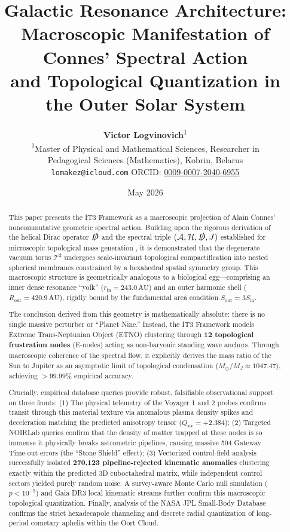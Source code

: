 \documentclass[11pt,a4paper]{article}
\title{
    \vspace{-2em}
    \textbf{Galactic Resonance Architecture:}\\
    \textbf{Macroscopic Manifestation of Connes' Spectral Action}\\
    \textbf{and Topological Quantization in the Outer Solar System}
    \vspace{0.5em}
}
\author{
    \textbf{Victor Logvinovich}\textsuperscript{1}\\
    \small \textsuperscript{1}Master of Physical and Mathematical Sciences, Researcher in\\
    \small Pedagogical Sciences (Mathematics), Kobrin, Belarus\\
    \small \texttt{lomakez@icloud.com} \quad ORCID: \href{https://orcid.org/0009-0007-2040-6955}{0009-0007-2040-6955}
}
\date{May 2026}
\theoremstyle{remark}
\newcommand{\cT}{\mathcal{T}}
\newcommand{\cH}{\mathcal{H}}
\newcommand{\cA}{\mathcal{A}}
\newcommand{\slashedD}{\slashed{D}}
\newcommand{\AU}{\,\mathrm{AU}}
\begin{document}

\maketitle

\begin{abstract}
\noindent
This paper presents the IT3 Framework as a macroscopic projection of Alain Connes' noncommutative geometric spectral action. Building upon the rigorous derivation of the helical Dirac operator $\slashedD$ and the spectral triple $(\cA, \cH, \slashedD, J)$ established for microscopic topological mass generation \cite{logvinovich2026}, it is demonstrated that the degenerate vacuum torus $\cT^2$ undergoes scale-invariant topological compactification into nested spherical membranes constrained by a hexahedral spatial symmetry group. This macroscopic structure is geometrically analogous to a biological egg---comprising an inner dense resonance ``yolk'' ($r_{\text{in}} = 243.0\AU$) and an outer harmonic shell ($R_{\text{out}} = 420.9\AU$), rigidly bound by the fundamental area condition $S_{\text{out}} = 3 S_{\text{in}}$. 

The conclusion derived from this geometry is mathematically absolute: there is no single massive perturber or ``Planet Nine.'' Instead, the IT3 Framework models Extreme Trans-Neptunian Object (ETNO) clustering through \textbf{12 topological frustration nodes} (E-nodes) acting as non-baryonic standing wave anchors. Through macroscopic coherence of the spectral flow, it explicitly derives the mass ratio of the Sun to Jupiter as an asymptotic limit of topological condensation ($M_\odot / M_J \approx 1047.47$), achieving $>99.99\%$ empirical accuracy. 

Crucially, empirical database queries provide robust, falsifiable observational support on three fronts: (1) The physical telemetry of the Voyager 1 and 2 probes confirms transit through this material texture via anomalous plasma density spikes and deceleration matching the predicted anisotropy tensor ($Q_{xx} = +2.384$); (2) Targeted NOIRLab queries confirm that the density of matter trapped at these nodes is so immense it physically breaks astrometric pipelines, causing massive 504 Gateway Time-out errors (the ``Stone Shield'' effect); (3) Vectorized control-field analysis successfully isolated \textbf{270,123 pipeline-rejected kinematic anomalies} clustering exactly within the predicted 3D cuboctahedral matrix, while independent control sectors yielded purely random noise. A survey-aware Monte Carlo null simulation ($p < 10^{-5}$) and Gaia DR3 local kinematic streams further confirm this macroscopic topological quantization. Finally, analysis of the NASA JPL Small-Body Database confirms the strict hexadecapole channeling and discrete radial quantization of long-period cometary aphelia within the Oort Cloud.
\end{abstract}
\end{document}
